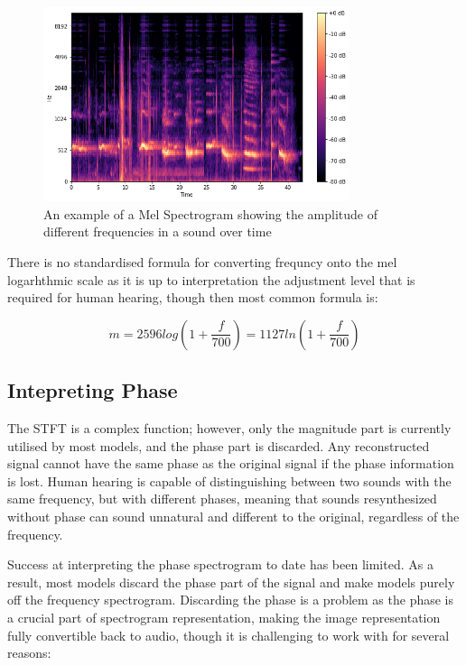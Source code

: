 \begin{figure}[H]
    \centering
    \includegraphics[width=0.8\textwidth]{literature_review/MelSpectrogram.png}
    \caption{An example of a  Mel Spectrogram showing the amplitude of different frequencies in a sound over time\cite{GettingToKnowTheMelSpectrogram}}
    \label{fig:spectrograms}
\end{figure}

There is no standardised formula for converting frequncy onto the mel logarhthmic scale as it is up to interpretation the adjustment level that is required for human hearing, though then most common formula is\cite{SpeechCommunication}:

\begin{equation}
    m = 2596 log(1 +  \frac{f}{700}) = 1127 ln (1 + \frac{f}{700})
\end{equation}

\subsection{Intepreting Phase}

The STFT is a complex function; however, only the magnitude part is currently utilised by most models, and the phase part is discarded. Any reconstructed signal cannot have the same phase as the original signal if the phase information is lost. Human hearing is capable of distinguishing between two sounds with the same frequency, but with different phases, meaning that sounds resynthesized without phase can sound unnatural and different to the original, regardless of the frequency.

Success at interpreting the phase spectrogram to date has been limited. As a result, most models discard the phase part of the signal and make models purely off the frequency spectrogram. Discarding the phase is a problem as the phase is a crucial part of spectrogram representation, making the image representation fully convertible back to audio, though it is challenging to work with for several reasons:

